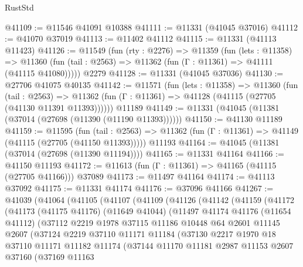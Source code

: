 \begin{lexlean}{RustStd}
\begin{coremodule}
@41109 := @11546 @41091 @10388
@41111 := @11331 (@41045 @37016)
@41112 := @41070 @37019
@41113 := @11402 @41112
@41115 := @11331 (@41113 @11423)
@41126 := @11549
    (fun (rty : @2276) =>
    @11359
      (fun (lets : @11358) =>
      @11360 (fun (tail : @2563) => @11362 (fun (Γ : @11361) => @41111 (@41115 @41080)))))
    @2279
@41128 := @11331 (@41045 @37036)
@41130 := @27706 @41075 @40135
@41142 := @11571
    (fun (lets : @11358) =>
    @11360
      (fun (tail : @2563) =>
      @11362 (fun (Γ : @11361) => @41128 (@41115 (@27705 (@41130 @11391 @11393))))))
    @11189
@41149 := @11331 (@41045 (@11381 (@37014 (@27698 (@11390 (@11190 @11393))))))
@41150 := @41130 @11189
@41159 := @11595
    (fun (tail : @2563) => @11362 (fun (Γ : @11361) => @41149 (@41115 (@27705 (@41150 @11393)))))
    @11193
@41164 := @41045 (@11381 (@37014 (@27698 (@11390 @11194))))
@41165 := @11331 @41164
@41166 := @41150 @11193
@41172 := @11613 (fun (Γ : @11361) => @41165 (@41115 (@27705 @41166))) @37089
@41173 := @11497 @41164
@41174 := @41113 @37092
@41175 := @11331 @41174
@41176 := @37096 @41166
@41267 := @41039
    (@41064
      (@41105
        (@41107
          (@41109
            (@41126
              (@41142
                (@41159
                  (@41172
                    (@41173
                      (@41175 @41176)
                      (@11649 @41044)
                      (@11497
                        @41174
                        @41176
                        (@11654 @41112)
                        (@37112
                          @2219
                          @1978
                          @37115
                          @11186
                          @10448
                          @64
                          @2601
                          @11145
                          @2607
                          (@37124
                            @2219
                            @37110
                            @11171
                            @11184
                            (@37130
                              @2217
                              @1970
                              @18
                              @37110
                              @11171
                              @11182
                              @11174
                              (@37144
                                @11170
                                @11181
                                @2987
                                @11153
                                @2607
                                @37160
                                (@37169
                                  @11163

\end{coremodule}
\end{lexlean}
